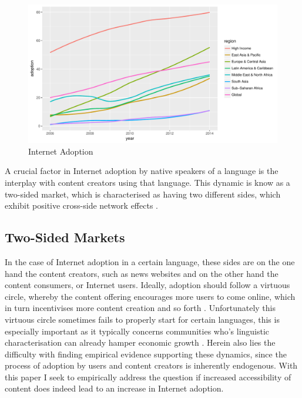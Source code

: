 \documentclass[a4paper,british]{article}\usepackage[]{graphicx}\usepackage[]{color}
\makeatletter
\def\maxwidth{ %
  \ifdim\Gin@nat@width>\linewidth
    \linewidth
  \else
    \Gin@nat@width
  \fi
}
\newenvironment{kframe}{%
 \def\at@end@of@kframe{}%
 \ifinner\ifhmode%
  \def\at@end@of@kframe{\end{minipage}}%
  \begin{minipage}{\columnwidth}%
 \fi\fi%
 \def\FrameCommand##1{\hskip\@totalleftmargin \hskip-\fboxsep
 \colorbox{shadecolor}{##1}\hskip-\fboxsep
     \hskip-\linewidth \hskip-\@totalleftmargin \hskip\columnwidth}%
 \MakeFramed {\advance\hsize-\width
   \@totalleftmargin\z@ \linewidth\hsize
   \@setminipage}}%
 {\par\unskip\endMakeFramed%
 \at@end@of@kframe}
\newenvironment{knitrout}{}{} %
\makeatother
\begin{document}
\begin{figure}[h]
\caption{Internet Adoption}

\begin{centering}
\label{fig:adoption_growth}
\par\end{centering}
\begin{knitrout}
\color{fgcolor}\begin{kframe}


{\ttfamily\noindent\itshape{}}\end{kframe}
\includegraphics[width=\maxwidth]{../misc/latex-mobile_growth-1} 

\end{knitrout}
\end{figure}

A crucial factor in Internet adoption by native speakers of a language
is the interplay with content creators using that language. This dynamic
is know as a two-sided market, which is characterised as having two
different sides, which exhibit positive cross-side network effects
\citep{parker2000information,parker2000internetwork,parker2005two}.

\subsection{Two-Sided Markets}

In the case of Internet adoption in a certain language, these sides
are on the one hand the content creators, such as news websites and
on the other hand the content consumers, or Internet users. Ideally,
adoption should follow a virtuous circle, whereby the content offering
encourages more users to come online, which in turn incentivises more
content creation and so forth \citep{rochet2003platform,rochet2006two}.
Unfortunately this virtuous circle sometimes fails to properly start
for certain languages, this is especially important as it typically
concerns communities who's linguistic characterisation can already
hamper economic growth \citep{arcand2013language}. Herein also lies
the difficulty with finding empirical evidence supporting these dynamics,
since the process of adoption by users and content creators is inherently
endogenous. With this paper I seek to empirically address the question
if increased accessibility of content does indeed lead to an increase
in Internet adoption.
\end{document}
